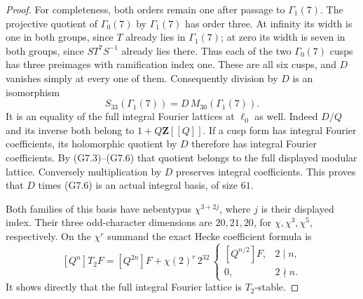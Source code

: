 \documentclass[11pt,a4paper]{article}
\theoremstyle{definition}
\begin{document}
\begin{proof}
For completeness, both orders remain one after passage to
\(\Gamma_1(7)\). The projective quotient of
\(\Gamma_0(7)\) by \(\Gamma_1(7)\) has order three.
At infinity its width is one in both groups, since \(T\)
already lies in \(\Gamma_1(7)\); at zero its width is seven
in both groups, since \(ST^7S^{-1}\) already lies there.
Thus each of the two \(\Gamma_0(7)\) cusps has three
preimages with ramification index one. These are all six
cusps, and \(D\) vanishes simply at every one of them.
Consequently division by \(D\) is an isomorphism
\[
 S_{33}(\Gamma_1(7))=D\,M_{30}(\Gamma_1(7)).
 \tag{G7.9}
\]
It is an equality of the full integral Fourier lattices
at \(\ell_0\) as well. Indeed \(D/Q\) and its inverse both
belong to \(1+Q\mathbf Z[[Q]]\). If a cusp form has integral
Fourier coefficients, its holomorphic quotient by \(D\)
therefore has integral Fourier coefficients. By (G7.3)--(G7.6)
that quotient belongs to the full displayed modular lattice.
Conversely multiplication by \(D\) preserves integral
coefficients. This proves that \(D\) times (G7.6) is an
actual integral basis, of size \(61\).

Both families of this basis have nebentypus
\(\chi^{3+2j}\), where \(j\) is their displayed index.
Their three odd-character dimensions are \(20,21,20\),
for \(\chi,\chi^3,\chi^5\), respectively.
On the \(\chi^r\) summand the exact Hecke coefficient formula is
\[
 [Q^n]T_2F=[Q^{2n}]F+
       \chi(2)^r\,2^{32}\,
       \begin{cases}[Q^{n/2}]F,&2\mid n,\\0,&2\nmid n.\end{cases}
 \tag{G7.10}
\]
It shows directly that the full integral Fourier lattice is
\(T_2\)-stable.


\end{proof}
\end{document}
